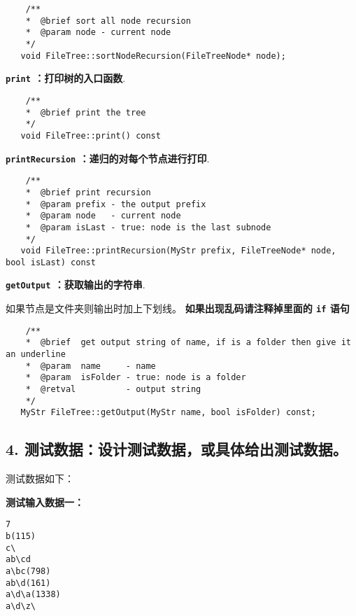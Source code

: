 \documentclass[a4paper]{ctexart}
\begin{document}
\begin{lstlisting}
    /**
    *  @brief sort all node recursion
    *  @param node - current node
    */
   void FileTree::sortNodeRecursion(FileTreeNode* node);
\end{lstlisting}

\vspace{3em}

\noindent \textbf{\texttt{print} ：打印树的入口函数}.

\begin{lstlisting}
    /**
    *  @brief print the tree
    */
   void FileTree::print() const
\end{lstlisting}

\vspace{3em}

\noindent \textbf{\texttt{printRecursion} ：递归的对每个节点进行打印}.

\begin{lstlisting}
    /**
    *  @brief print recursion
    *  @param prefix - the output prefix
    *  @param node   - current node
    *  @param isLast - true: node is the last subnode
    */
   void FileTree::printRecursion(MyStr prefix, FileTreeNode* node, bool isLast) const
\end{lstlisting}

\vspace{3em}

\noindent \textbf{\texttt{getOutput} ：获取输出的字符串}.

如果节点是文件夹则输出时加上下划线。
\textbf{如果出现乱码请注释掉里面的 \texttt{if} 语句}

\begin{lstlisting}
    /**
    *  @brief  get output string of name, if is a folder then give it an underline
    *  @param  name     - name
    *  @param  isFolder - true: node is a folder
    *  @retval          - output string
    */
   MyStr FileTree::getOutput(MyStr name, bool isFolder) const;
\end{lstlisting}

\vspace{3em}

\subsection*{4. 测试数据：设计测试数据，或具体给出测试数据。\\ }
测试数据如下：

\noindent \textbf{测试输入数据一：}
\begin{lstlisting}[numbers=none]
7
b(115)
c\
ab\cd
a\bc(798)
ab\d(161)
a\d\a(1338)
a\d\z\    
\end{lstlisting}
\end{document}
